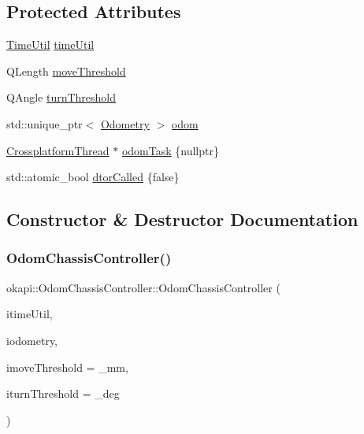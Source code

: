 \subsection*{Protected Attributes}
\begin{DoxyCompactItemize}
\item 
\mbox{\hyperlink{classokapi_1_1TimeUtil}{Time\+Util}} \mbox{\hyperlink{classokapi_1_1OdomChassisController_a3afde0b7a16a998873923f41fedb041a}{time\+Util}}
\item 
Q\+Length \mbox{\hyperlink{classokapi_1_1OdomChassisController_a8fc34ac66535e1a2afaf8856f09a9f95}{move\+Threshold}}
\item 
Q\+Angle \mbox{\hyperlink{classokapi_1_1OdomChassisController_ac0d74721713d2928a047562675ae25ef}{turn\+Threshold}}
\item 
std\+::unique\+\_\+ptr$<$ \mbox{\hyperlink{classokapi_1_1Odometry}{Odometry}} $>$ \mbox{\hyperlink{classokapi_1_1OdomChassisController_a7167160f48f0f75fb1bc7964c4cc608b}{odom}}
\item 
\mbox{\hyperlink{classCrossplatformThread}{Crossplatform\+Thread}} $\ast$ \mbox{\hyperlink{classokapi_1_1OdomChassisController_a75246d7a17442c9a63afaef68bbf95e0}{odom\+Task}} \{nullptr\}
\item 
std\+::atomic\+\_\+bool \mbox{\hyperlink{classokapi_1_1OdomChassisController_a2af36f833e8ac382c4386f729f904bae}{dtor\+Called}} \{false\}
\end{DoxyCompactItemize}


\subsection{Constructor \& Destructor Documentation}
\mbox{\label{classokapi_1_1OdomChassisController_a91015290cdd5f9c459adfb59115bc92d}} 
\subsubsection{\texorpdfstring{OdomChassisController()}{OdomChassisController()}}
{\footnotesize\ttfamily okapi\+::\+Odom\+Chassis\+Controller\+::\+Odom\+Chassis\+Controller (\begin{DoxyParamCaption}\item[{const \mbox{\hyperlink{classokapi_1_1TimeUtil}{Time\+Util}} \&}]{itime\+Util,  }\item[{std\+::unique\+\_\+ptr$<$ \mbox{\hyperlink{classokapi_1_1Odometry}{Odometry}} $>$}]{iodometry,  }\item[{const Q\+Length \&}]{imove\+Threshold = {\+\_\+mm},  }\item[{const Q\+Angle \&}]{iturn\+Threshold = {\+\_\+deg} }\end{DoxyParamCaption})}


